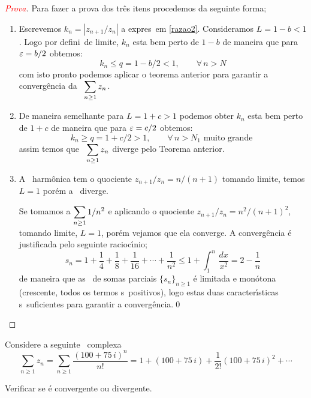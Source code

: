 \begin{proof}[\textcolor{red}{Prova}]
Para fazer a prova dos tr\^es itens procedemos da seguinte forma;
\begin{enumerate}[label=\rm{(\arabic*)}]
  \item Escrevemos $k_n=|z_{n+1}/z_n|$ a expres\ao\ em
  \eqref{razao2}. Consideramos $L=1-b<1$. Logo por defini\cao\ de
  limite, $k_n$ esta bem perto  de $1-b$ de maneira que para
  $\varepsilon=b/2$ obtemos:
\begin{equation*}
  k_n\leq q=1-b/2<1,\qquad \forall\, n>N
\end{equation*}
com isto pronto podemos aplicar o teorema anterior para garantir a
converg\^encia da \ser\ $\displaystyle{\sum_{n\geq 1}z_n}$.
  \item De maneira semelhante para $L=1+c>1$  podemos obter $k_n$ esta bem perto
   de $1+c$ de maneira que para  $\varepsilon=c/2$ obtemos:
   \begin{equation*}
  k_n\geq q=1+c/2>1,\qquad \forall\, n>N_1 \text{ muito grande }
\end{equation*}
assim temos que  \ser\ $\displaystyle{\sum_{n\geq 1}z_n}$ diverge pelo
Teorema anterior.
  \item A \ser\ harm\^onica tem o quociente $z_{n+1}/z_n=n/(n+1)$
  tomando limite, temos $L=1$ por\'em a \ser\ diverge.

  Se tomamos  a \ser $\displaystyle{\sum_{n\geq 1}1/n^2}$ e aplicando o
  quociente $z_{n+1}/z_n=n^2/(n+1)^2$, tomando limite, $L=1$,
  por\'em vejamos que ela converge. A converg\^encia \'e
  justificada pelo seguinte racioc\'{\i}nio;
\begin{equation*}
  s_n=1+\frac{1}{4}+\frac{1}{8}+\frac{1}{16}+\cdots+\frac{1}{n^2}\leq
  1+\int_1^n\,\frac{dx}{x^2}=2-\frac{1}{n}
\end{equation*}
de maneira que as \seqs\ de somas parciais $\{s_n\}_{n\geq1}$ \'e
limitada e mon\'otona (crescente, todos os termos s\ao\
positivos), logo estas duas caracter\'{\i}sticas s\ao\ suficientes para
garantir a converg\^encia.\qed
\end{enumerate}
\renewcommand{\qed}{}
\end{proof}

\begin{exer}
Considere a seguinte \ser\ complexa
\begin{equation*}
\sum_{n\geq 1}z_n=\sum_{n\geq
1}\frac{(100+75\,i)^n}{n!}=1+(100+75\,i)+\frac{1}{2!}(100+75\,i)^2+\cdots
\end{equation*}

Verificar se \'e convergente ou divergente.
\end{exer}

